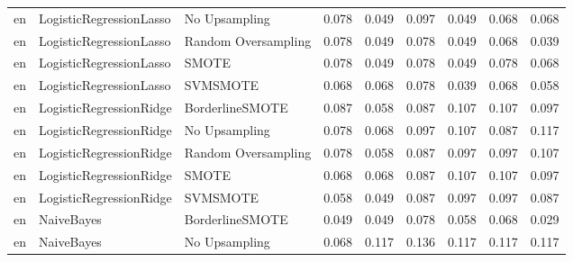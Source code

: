 \begin{tabular}{lllllllll}
      en &      LogisticRegressionLasso &       No Upsampling & 0.078 &                     0.049 &                 0.097 &                  0.049 &                                   0.068 &     0.068 \\
      en &      LogisticRegressionLasso & Random Oversampling & 0.078 &                     0.049 &                 0.078 &                  0.049 &                                   0.068 &     0.039 \\
      en &      LogisticRegressionLasso &               SMOTE & 0.078 &                     0.049 &                 0.078 &                  0.049 &                                   0.078 &     0.068 \\
      en &      LogisticRegressionLasso &            SVMSMOTE & 0.068 &                     0.068 &                 0.078 &                  0.039 &                                   0.068 &     0.058 \\
      en &      LogisticRegressionRidge &     BorderlineSMOTE & 0.087 &                     0.058 &                 0.087 &                  0.107 &                                   0.107 &     0.097 \\
      en &      LogisticRegressionRidge &       No Upsampling & 0.078 &                     0.068 &                 0.097 &                  0.107 &                                   0.087 &     0.117 \\
      en &      LogisticRegressionRidge & Random Oversampling & 0.078 &                     0.058 &                 0.087 &                  0.097 &                                   0.097 &     0.107 \\
      en &      LogisticRegressionRidge &               SMOTE & 0.068 &                     0.068 &                 0.087 &                  0.107 &                                   0.107 &     0.097 \\
      en &      LogisticRegressionRidge &            SVMSMOTE & 0.058 &                     0.049 &                 0.087 &                  0.097 &                                   0.097 &     0.087 \\
      en &                   NaiveBayes &     BorderlineSMOTE & 0.049 &                     0.049 &                 0.078 &                  0.058 &                                   0.068 &     0.029 \\
      en &                   NaiveBayes &       No Upsampling & 0.068 &                     0.117 &                 0.136 &                  0.117 &                                   0.117 &     0.117 \\

\end{tabular}
